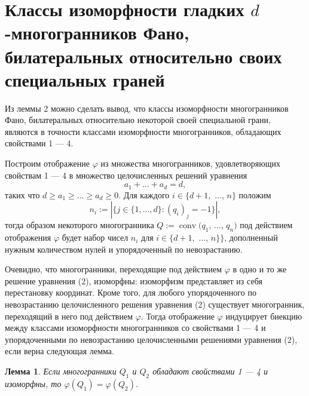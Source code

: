 \documentclass[12pt,notitlepage]{article}
\DeclareMathOperator{\conv}{conv}
\newtheorem{lemma}{Лемма}
\begin{document}
	\section{Классы изоморфности гладких $d$-многогранников Фано, билатеральных относительно своих специальных граней}
	
	Из леммы 2 можно сделать вывод, что классы изоморфности многогранников Фано, билатеральных относительно некоторой своей специальной грани, являются в точности классами изоморфности многогранников, обладающих свойствами 1 --- 4.
	
	Построим отображение $\varphi$ из множества многогранников, удовлетворяющих свойствам 1 --- 4 в множество целочисленных решений уравнения
	\[
	a_1 + ... + a_d = d, \tag{2} \label{bseeq}
	\]
	таких что $d \geq a_1 \geq ... \geq a_d \geq 0$. Для каждого $i \in \{d + 1,$ ..., $n\}$ положим
	\[
	n_i := |\{j \in \{1, ..., d\} : (q_i)_j = -1\}|,
	\]
	тогда образом некоторого многогранника $Q := \conv(q_1$, ..., $q_n)$ под действием отображения $\varphi$ будет набор чисел $n_i$ для $i \in \{d + 1,$ ..., $n\}\}$, дополненный нужным количеством нулей и упорядоченный по невозрастанию.
	
	Очевидно, что многогранники, переходящие под действием $\varphi$ в одно и то же решение уравнения (2), изоморфны: изоморфизм представляет из себя перестановку координат. Кроме того, для любого упорядоченного по невозрастанию целочисленного решения уравнения (2) существует многогранник, переходящий в него под действием $\varphi$. Тогда отображение $\varphi$ индуцирует биекцию между классами изоморфности многогранников со свойствами 1 --- 4 и упорядоченными по невозрастанию целочисленными решениями уравнения (2), если верна следующая лемма.
	
	\begin{lemma}		
		Если многогранники $Q_1$ и $Q_2$ обладают свойствами 1 --- 4 и изоморфны, то $\varphi(Q_1)=\varphi(Q_2)$.
	\end{lemma}
	
\end{document}
